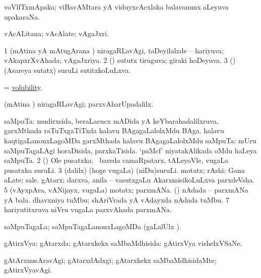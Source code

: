 \bentry 
{} 
\gl{\nA}
\expl{}
\bmng
 voVlfTxmApaka; viBavAMtara yA viduyxcAcxlaka balavanunx aLeyuva upakaraNa. 
\emng
\eentry

\bentry
{} 
\gl{\nA}
\expl{}
\bmng
 vAcALitana; vAcAlate; vAgaJxri. 
\emng
\eentry

\bentry
{} 
\gl{\gu}
\expl{}
\bmng
\bnum
\num{1} (mAtina yA mAtugArana \vi) niragaRLavAgi, taDeyilalxde -- hariyuva; vAkapxrXvAhada; vAgaJxriya. 
\num{2} (\pArxparx) sututx tiruguva; giraki hoDeyuva. 
\num{3} (\savi) (Asareya sutatx) suruLi sutitxkoLuLxva. 
\enum
\emng
\eentry

\bentry 
{} 
\gl{\nA}
\expl{}
\bmng
 = \hyperlink{volubility}{volubility}. 
\emng
\eentry

\bentry
{} 
\gl{\kirxvi}
\expl{}
\bmng
 (mAtina \vi) niragaRLavAgi; parxvAharUpadalilx. 
\emng
\eentry

\bentry 
{} 
\gl{\nA}
\expl{}
\bmng
\bnum
{} saMpuTa: 
\banum
{} mudirxsida, beraLacucx mADida yA keYbarahadalilxruva, garxMthada raTuTxgaTiTxda halavu BAgagaLalolxMdu BAga. 
 halavu kaqtigaLanonxLagoMDa garxMthada halavu BAgagaLalolxMdu saMpuTa:  mUru saMpuTagaLAgi horaDisida, parxkaTisida.  `paMcf' niyatakAlikada oMdu haLeya saMpuTa. 
\eanum
\numie
\num{2} (\ca) Ole pusatxka; \sA\ bareda camaRpatarx, tALeyoVle, \mo vugaLa pusatxka suruLi. 
\num{3} (\bava dalilx) (hoge \mo vugaLa) (niDu)suruLi. 
\banum
{} motatx; rAshi; Gana aLate; sale. 
 gAtarx; darxva, anila -- vasutxgaLu AkarxmisikoLuLxva parxdeVsha. 
\eanum
\numie
\num{5} (vAyxpAra, vANijayx, \mo vugaLa) motatx; parxmANa. 
 (\saM) 
\banum
{} nAdada -- parxmANa yA bala. 
 dhavxniya tuMbu; shAriVrada yA vAdayxda nAdada tuMbu. 
\eanum
\numie
\num{7} hariyutitxruva niVru \mo vugaLa parxvAhada parxmANa. 
\enum
\emng
\eentry

\bentry
{} 
\gl{\gu}
\expl{}
\bmng
 saMpuTagaLa; saMpuTagaLanonxLagoMDa (\saMpa gaLalUlx \parx). 
\emng
\eentry

\bentry 
{} 
\gl{\gu}
\expl{}
\bmng
 gAtirxVya; gAtarxda; gAtarxkekx saMbaMdhisida:  gAtirxVya vishelxVSaNe. 
\emng
\eentry

\bentry
{} 
\gl{\kirxvi}
\expl{}
\bmng
 gAtArxnusAravAgi; gAtarxdAdxgi; gAtarxkekx saMbaMdhisidaMte; gAtirxVyavAgi. 
\emng
\eentry

